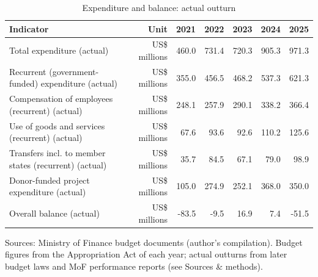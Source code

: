\begin{table}[htbp]\centering
\caption{Expenditure and balance: actual outturn}
\begin{tabular}{lrrrrrr}
\toprule
Indicator & Unit & 2021 & 2022 & 2023 & 2024 & 2025 \\
\midrule
Total expenditure (actual) & US\$ millions & 460.0 & 731.4 & 720.3 & 905.3 & 971.3 \\
Recurrent (government-funded) expenditure (actual) & US\$ millions & 355.0 & 456.5 & 468.2 & 537.3 & 621.3 \\
Compensation of employees (recurrent) (actual) & US\$ millions & 248.1 & 257.9 & 290.1 & 338.2 & 366.4 \\
Use of goods and services (recurrent) (actual) & US\$ millions & 67.6 & 93.6 & 92.6 & 110.2 & 125.6 \\
Transfers incl. to member states (recurrent) (actual) & US\$ millions & 35.7 & 84.5 & 67.1 & 79.0 & 98.9 \\
Donor-funded project expenditure (actual) & US\$ millions & 105.0 & 274.9 & 252.1 & 368.0 & 350.0 \\
Overall balance (actual) & US\$ millions & -83.5 & -9.5 & 16.9 & 7.4 & -51.5 \\
\bottomrule
\end{tabular}
\par\smallskip\footnotesize Sources: Ministry of Finance budget documents (author's compilation). Budget figures from the Appropriation Act of each year; actual outturns from later budget laws and MoF performance reports (see Sources \& methods).
\end{table}
